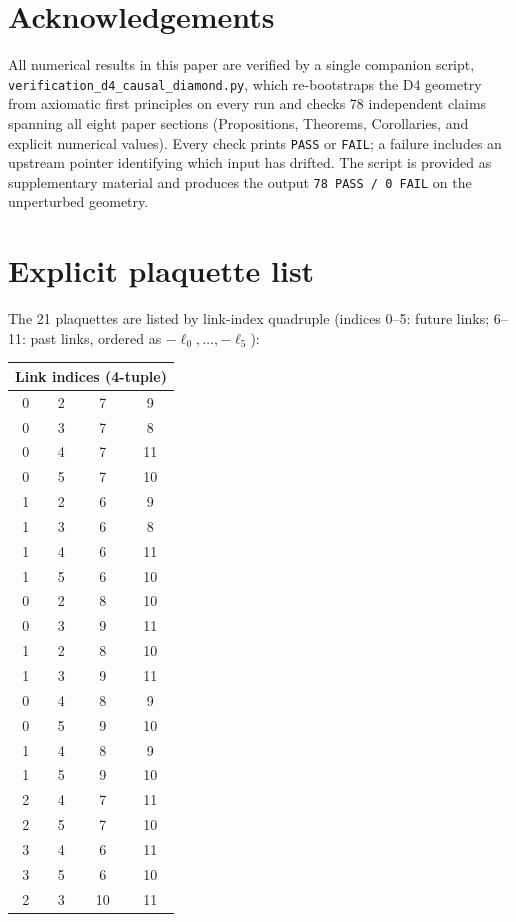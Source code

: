 \documentclass[12pt,a4paper]{article}
\theoremstyle{plain}
\theoremstyle{definition}
\begin{document}
\section*{Acknowledgements}

All numerical results in this paper are verified by a single companion
script, \texttt{verification\_d4\_causal\_diamond.py}, which re-bootstraps
the D4 geometry from axiomatic first principles on every run and checks
78 independent claims spanning all eight paper sections (Propositions,
Theorems, Corollaries, and explicit numerical values).  Every check prints
\texttt{PASS} or \texttt{FAIL}; a failure includes an upstream pointer
identifying which input has drifted.  The script is provided as
supplementary material and produces the output
\texttt{78 PASS / 0 FAIL} on the unperturbed geometry.

\appendix

\section{Explicit plaquette list}
\label{app:plaquettes}

The 21 plaquettes are listed by link-index quadruple (indices 0--5:
future links; 6--11: past links, ordered as $-\ell_0, \ldots, -\ell_5$):

\begin{center}
\small
\begin{tabular}{cccc}
\toprule
\multicolumn{4}{c}{Link indices (4-tuple)} \\
\midrule
0 & 2 & 7 & 9 \\
0 & 3 & 7 & 8 \\
0 & 4 & 7 & 11 \\
0 & 5 & 7 & 10 \\
1 & 2 & 6 & 9 \\
1 & 3 & 6 & 8 \\
1 & 4 & 6 & 11 \\
1 & 5 & 6 & 10 \\
0 & 2 & 8 & 10 \\
0 & 3 & 9 & 11 \\
1 & 2 & 8 & 10 \\
1 & 3 & 9 & 11 \\
0 & 4 & 8 & 9 \\
0 & 5 & 9 & 10 \\
1 & 4 & 8 & 9 \\
1 & 5 & 9 & 10 \\
2 & 4 & 7 & 11 \\
2 & 5 & 7 & 10 \\
3 & 4 & 6 & 11 \\
3 & 5 & 6 & 10 \\
2 & 3 & 10 & 11 \\
\bottomrule
\end{tabular}
\end{center}
\end{document}
